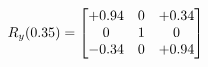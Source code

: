 \documentclass[preview]{standalone}
\begin{document}
\begin{align*}
\special{dvisvgm:raw <g id='unique000'>}R_{y}(0.35) = \begin{bmatrix}+0.94 & 0 & +0.34 \\0 & 1 & 0 \\-0.34 & 0 & +0.94\end{bmatrix}\special{dvisvgm:raw </g>}
\end{align*}
\end{document}
